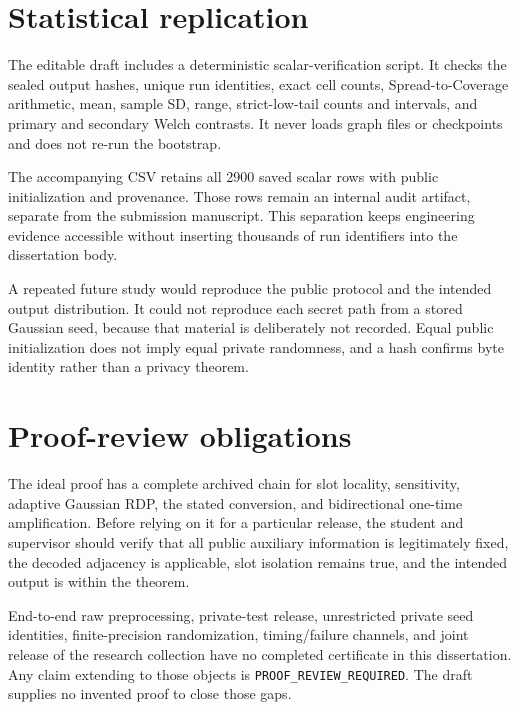 \section{Statistical replication}
The editable draft includes a deterministic scalar-verification script. It checks the sealed output hashes, unique run identities, exact cell counts, Spread-to-Coverage arithmetic, mean, sample SD, range, strict-low-tail counts and intervals, and primary and secondary Welch contrasts. It never loads graph files or checkpoints and does not re-run the bootstrap.

The accompanying CSV retains all 2900 saved scalar rows with public initialization and provenance. Those rows remain an internal audit artifact, separate from the submission manuscript. This separation keeps engineering evidence accessible without inserting thousands of run identifiers into the dissertation body.

A repeated future study would reproduce the public protocol and the intended output distribution. It could not reproduce each secret path from a stored Gaussian seed, because that material is deliberately not recorded. Equal public initialization does not imply equal private randomness, and a hash confirms byte identity rather than a privacy theorem.

\section{Proof-review obligations}
The ideal proof has a complete archived chain for slot locality, sensitivity, adaptive Gaussian RDP, the stated conversion, and bidirectional one-time amplification. Before relying on it for a particular release, the student and supervisor should verify that all public auxiliary information is legitimately fixed, the decoded adjacency is applicable, slot isolation remains true, and the intended output is within the theorem.

End-to-end raw preprocessing, private-test release, unrestricted private seed identities, finite-precision randomization, timing/failure channels, and joint release of the research collection have no completed certificate in this dissertation. Any claim extending to those objects is \texttt{PROOF\_REVIEW\_REQUIRED}. The draft supplies no invented proof to close those gaps.
